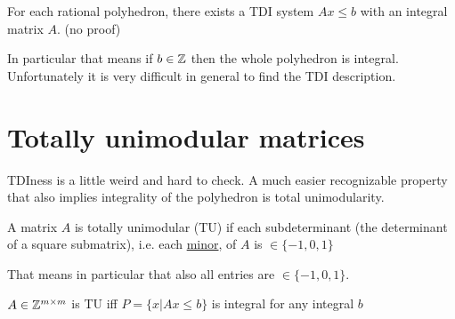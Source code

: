 \begin{thm} For each rational polyhedron, there exists a TDI system $Ax\leq b$ with an integral matrix $A$. {\small (no proof)}
\end{thm}

In particular that means if $b\in \mathbb{Z}$ then the whole polyhedron is integral. Unfortunately it is very difficult in general to find the TDI description.

\section{Totally unimodular matrices}

TDIness is a little weird and hard to check. A much easier recognizable property that also implies integrality of the polyhedron is total unimodularity.

\begin{Def} A matrix $A$ is totally unimodular (TU) if each subdeterminant (the determinant of a square submatrix), i.e. each \href{http://en.wikipedia.org/wiki/Minor\_\%28linear\_algebra\%29}{minor}, of $A$ is $\in \{-1,0,1\}$
\end{Def}

That means in particular that also all entries are $\in \{-1,0,1\}$.

\begin{thm} $A\in \mathbb{Z}^{m\times m}$ is TU iff $P=\{x|Ax\leq b\}$ is integral for any integral $b$
\end{thm}

